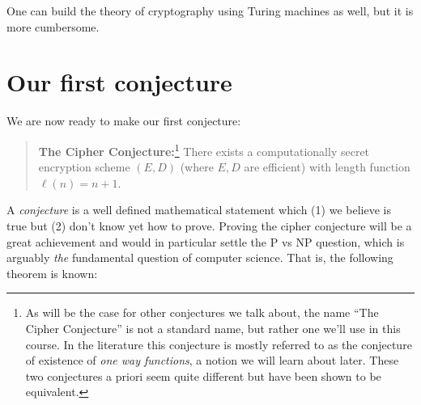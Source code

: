 One can build the theory of cryptography using Turing machines as well,
but it is more cumbersome.

\hypertarget{computebeyondfunctions}{}

\section{Our first conjecture}\label{2-Our-first-conjecture}

We are now ready to make our first conjecture:

\begin{quote}
\textbf{The Cipher Conjecture:}\footnote{As will be the case for other
  conjectures we talk about, the name ``The Cipher Conjecture'' is not a
  standard name, but rather one we'll use in this course. In the
  literature this conjecture is mostly referred to as the conjecture of
  existence of \emph{one way functions}, a notion we will learn about
  later. These two conjectures a priori seem quite different but have
  been shown to be equivalent.} There exists a computationally secret
encryption scheme \((E,D)\) (where \(E,D\) are efficient) with length
function \(\ell(n)=n+1\).
\end{quote}

A \emph{conjecture} is a well defined mathematical statement which (1)
we believe is true but (2) don't know yet how to prove. Proving the
cipher conjecture will be a great achievement and would in particular
settle the P vs NP question, which is arguably \emph{the} fundamental
question of computer science. That is, the following theorem is known:

\hypertarget{PNPcipherthm}{}

